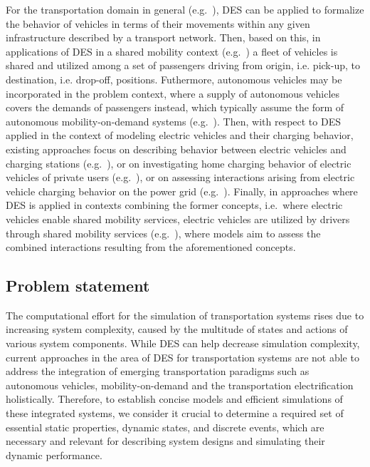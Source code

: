 \documentclass[graybox]{svmult}
\begin{document}
For the transportation domain in general (e.g.~\cite{burghout2006discrete}), DES can be applied to formalize the behavior of vehicles in terms of their movements within any given infrastructure described by a transport network.
Then, based on this, in applications of DES in a shared mobility context (e.g.~\cite{clemente2013discrete}) a fleet of vehicles is shared and utilized among a set of passengers driving from origin, i.e. pick-up, to destination, i.e. drop-off, positions.
Futhermore, autonomous vehicles may be incorporated in the problem context, where a supply of autonomous vehicles covers the demands of passengers instead, which typically assume the form of autonomous mobility-on-demand systems (e.g.~\cite{jager2018multi, gurumurthy2021system}).
Then, with respect to DES applied in the context of modeling electric vehicles and their charging behavior, existing approaches focus on describing behavior between electric vehicles and charging stations (e.g.~\cite{lebeau2013implementing}), or on investigating home charging behavior of electric vehicles of private users (e.g.~\cite{lopez2021modeling}), or on assessing interactions arising from electric vehicle charging behavior on the power grid (e.g.~\cite{darabi2013event, ferro2019predictive}).
Finally, in approaches where DES is applied in contexts combining the former concepts, i.e.\ where electric vehicles enable shared mobility services, electric vehicles are utilized by drivers through shared mobility services (e.g.~\cite{fanti2017fleet, hamroun2020modelling, li2021simulation}), where models aim to assess the combined interactions resulting from the aforementioned concepts.

\subsection{Problem statement}

The computational effort for the simulation of transportation systems rises due to increasing system complexity, caused by the multitude of states and actions of various system components.
While DES can help decrease simulation complexity, current approaches in the area of DES for transportation systems are not able to address the integration of emerging transportation paradigms such as autonomous vehicles, mobility-on-demand and the transportation electrification holistically.
Therefore, to establish concise models and efficient simulations of these integrated systems, we consider it crucial to determine a required set of essential static properties, dynamic states, and discrete events, which are necessary and relevant for describing system designs and simulating their dynamic performance.
\end{document}
